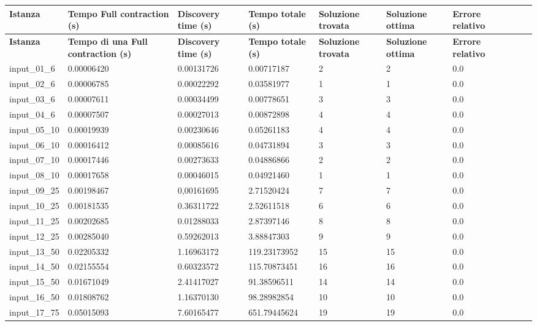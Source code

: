 \scriptsize
\begin{tabularx}{\textwidth}{*{10}{Y}}
    \toprule
    \textbf{Istanza} & \textbf{Tempo Full contraction (s)} & \textbf{Discovery time (s)} & \textbf{Tempo totale (s)} & \textbf{Soluzione trovata} & \textbf{Soluzione ottima} & \textbf{Errore relativo}\\
    \endfirsthead
    \toprule
    \textbf{Istanza} & \textbf{Tempo di una Full contraction (s)} & \textbf{Discovery time (s)} & \textbf{Tempo totale (s)} & \textbf{Soluzione trovata} & \textbf{Soluzione ottima} & \textbf{Errore relativo}\\
    \endhead
    \midrule
    input\_01\_6	&	0.00006420	&	0.00131726	&	0.00717187	&	2	&	2	&	0.0	\\\midrule
	input\_02\_6	&	0.00006785	&	0.00022292	&	0.03581977	&	1	&	1	&	0.0	\\\midrule
	input\_03\_6	&	0.00007611	&	0.00034499	&	0.00778651	&	3	&	3	&	0.0	\\\midrule
	input\_04\_6	&	0.00007507	&	0.00027013	&	0.00872898	&	4	&	4	&	0.0	\\\midrule
	input\_05\_10	&	0.00019939	&	0.00230646	&	0.05261183	&	4	&	4	&	0.0	\\\midrule
	input\_06\_10	&	0.00016412	&	0.00085616	&	0.04731894	&	3	&	3	&	0.0	\\\midrule
	input\_07\_10	&	0.00017446	&	0.00273633	&	0.04886866	&	2	&	2	&	0.0	\\\midrule
	input\_08\_10	&	0.00017658	&	0.00046015	&	0.04921460	&	1	&	1	&	0.0	\\\midrule
	input\_09\_25	&	0.00198467	&	0,00161695	&	2.71520424	&	7	&	7	&	0.0	\\\midrule
	input\_10\_25	&	0.00181535	&	0.36311722	&	2.52611518	&	6	&	6	&	0.0	\\\midrule
	input\_11\_25	&	0.00202685	&	0.01288033	&	2.87397146	&	8	&	8	&	0.0	\\\midrule
	input\_12\_25	&	0.00285040	&	0.59262013	&	3.88847303	&	9	&	9	&	0.0	\\\midrule
	input\_13\_50	&	0.02205332	&	1.16963172	&	119.23173952	&	15	&	15	 & 0.0	\\\midrule
	input\_14\_50	&	0.02155554	&	0.60323572	&	115.70873451	&	16	&	16	 & 0.0	\\\midrule
	input\_15\_50	&	0.01671049	&	2.41417027	&	91.38596511		&	14	&	14	 & 0.0	\\\midrule
	input\_16\_50	&	0.01808762	&	1.16370130	&	98.28982854		&	10	&	10	 & 0.0	\\\midrule
	input\_17\_75	&	0.05015093	&	7.60165477	&	651.79445624	&	19	&	19	 & 0.0	\\\midrule

\end{tabularx}
